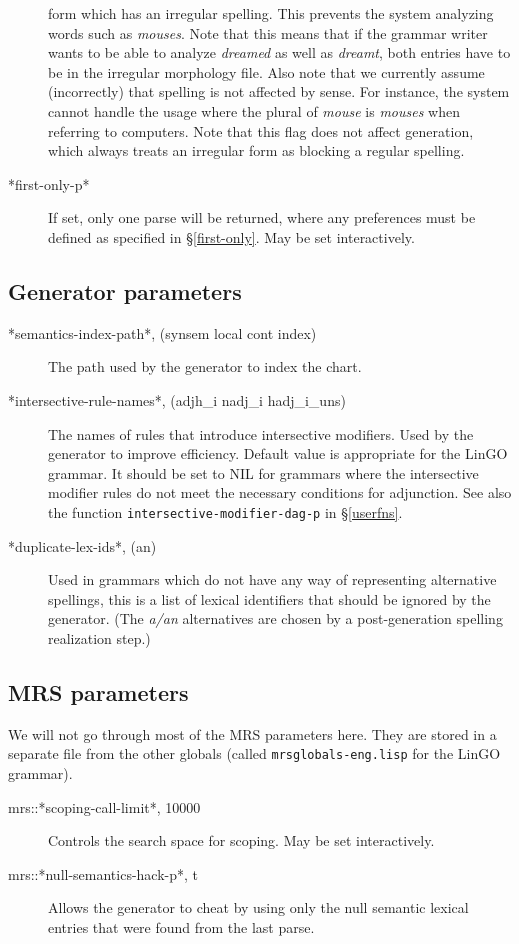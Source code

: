 \documentclass[12pt]{report}
\newcommand{\filename}[1]{{\tt #1}}
\newcommand{\functionname}[1]{{\tt #1}}
\begin{document}
\begin{description}
form which has an irregular spelling.  This prevents the system
analyzing words such as {\it mouses}.  Note that this means
that if the grammar writer wants to be able to analyze {\it dreamed} as
well as {\it dreamt}, both entries have to be in the irregular morphology
file.  Also note that we currently assume (incorrectly) that spelling is
not affected by sense. For instance, the system cannot handle
the usage where the plural
of {\it mouse} is {\it mouses} when referring to computers.
Note that this flag does not affect generation, which
always treats an irregular form as blocking a regular spelling.
\item[*first-only-p*] If set, only one parse will be returned,
where any preferences must be defined as specified
in \S\ref{first-only}.  May be set interactively.
\end{description}

\subsection{Generator parameters}
\label{genglob}

\begin{description}
\item[*semantics-index-path*, (synsem local cont index)]
The path used by the generator to index the chart.
\item[*intersective-rule-names*, (adjh\_i nadj\_i hadj\_i\_uns)]
The names of rules that introduce intersective modifiers.
Used by the generator to improve efficiency.
Default value is appropriate for the LinGO grammar.
It should be set to NIL for grammars where the intersective modifier
rules do not meet the necessary conditions for adjunction.
See also the function
\functionname{intersective-modifier-dag-p} in \S\ref{userfns}.
\item[*duplicate-lex-ids*, (an)]
Used in grammars which do not
have any way of representing alternative spellings, this is a list
of lexical identifiers that should be ignored by the generator.
(The {\it a/an} alternatives are chosen by a post-generation spelling
realization step.)
\end{description}

\subsection{MRS parameters}
\label{mrsglob}

We will not go through most of the MRS parameters here.  They are
stored in a separate file from the other globals (called 
\filename{mrsglobals-eng.lisp} for the LinGO grammar).
\begin{description}
\item[mrs::*scoping-call-limit*, 10000]  
Controls the search space for scoping.  
May be set interactively.
\item[mrs::*null-semantics-hack-p*, t]
Allows the generator to cheat by using only the null semantic lexical
entries that were found from the last parse.
\end{description}
\end{document}
